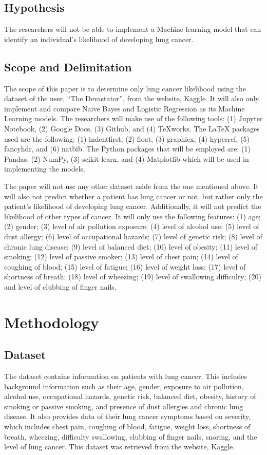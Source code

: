 \documentclass[runningheads]{llncs}
\begin{document}
\subsection{Hypothesis}
The researchers will not be able to implement a Machine learning model that can identify an individual’s likelihood of developing lung cancer.

\subsection{Scope and Delimitation}
The scope of this paper is to determine only lung cancer likelihood using the dataset of the user, “The Devastator”, from the website, Kaggle. It will also only implement and compare Naive Bayes and Logistic Regression as its Machine Learning models. The researchers will make use of the following tools: (1) Jupyter Notebook, (2) Google Docs, (3) Github, and (4) TeXworks. The LaTeX packages used are the following: (1) indentfirst, (2) float, (3) graphicx, (4) hyperref, (5) fancyhdr, and (6) natbib. The Python packages that will be employed are: (1) Pandas, (2) NumPy, (3) scikit-learn, and (4) Matplotlib which will be used in implementing the models.

The paper will not use any other dataset aside from the one mentioned above. It will also not predict whether a patient has lung cancer or not, but rather only the patient’s likelihood of developing lung cancer. Additionally, it will not predict the likelihood of other types of cancer. It will only use the following features: (1) age; (2) gender; (3) level of air pollution exposure; (4) level of alcohol use; (5) level of dust allergy; (6) level of occupational hazards; (7) level of genetic risk; (8) level of chronic lung disease; (9) level of balanced diet; (10) level of obesity; (11) level of smoking; (12) level of passive smoker; (13) level of chest pain; (14) level of coughing of blood; (15) level of fatigue; (16) level of weight loss; (17) level of shortness of breath; (18) level of wheezing; (19) level of swallowing difficulty; (20) and level of clubbing of finger nails.

\section{Methodology}

\subsection{Dataset}
The dataset contains information on patients with lung cancer. This includes background information such as their age, gender, exposure to air pollution, alcohol use, occupational hazards, genetic risk, balanced diet, obesity, history of smoking or passive smoking, and presence of dust allergies and chronic lung disease. It also provides data of their lung cancer symptoms based on severity, which includes chest pain, coughing of blood, fatigue, weight loss, shortness of breath, wheezing, difficulty swallowing, clubbing of finger nails, snoring, and the level of lung cancer. This dataset was retrieved from the website, Kaggle.
\end{document}
